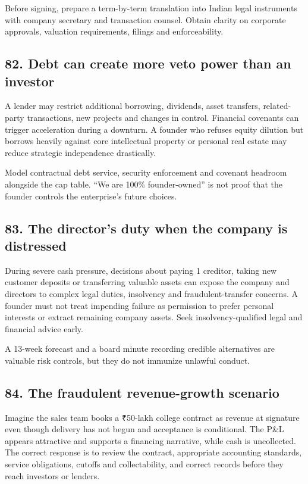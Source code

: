 Before signing, prepare a term-by-term translation into Indian legal instruments with company secretary and transaction counsel. Obtain clarity on corporate approvals, valuation requirements, filings and enforceability.

\subsection{82. Debt can create more veto power than an investor}

A lender may restrict additional borrowing, dividends, asset transfers, related-party transactions, new projects and changes in control. Financial covenants can trigger acceleration during a downturn. A founder who refuses equity dilution but borrows heavily against core intellectual property or personal real estate may reduce strategic independence drastically.

Model contractual debt service, security enforcement and covenant headroom alongside the cap table. ``We are 100\% founder-owned'' is not proof that the founder controls the enterprise's future choices.

\subsection{83. The director's duty when the company is distressed}

During severe cash pressure, decisions about paying 1 creditor, taking new customer deposits or transferring valuable assets can expose the company and directors to complex legal duties, insolvency and fraudulent-transfer concerns. A founder must not treat impending failure as permission to prefer personal interests or extract remaining company assets. Seek insolvency-qualified legal and financial advice early.

A 13-week forecast and a board minute recording credible alternatives are valuable risk controls, but they do not immunize unlawful conduct.

\subsection{84. The fraudulent revenue-growth scenario}

Imagine the sales team books a \textnormal{₹}50-lakh college contract as revenue at signature even though delivery has not begun and acceptance is conditional. The P\&L appears attractive and supports a financing narrative, while cash is uncollected. The correct response is to review the contract, appropriate accounting standards, service obligations, cutoffs and collectability, and correct records before they reach investors or lenders.

